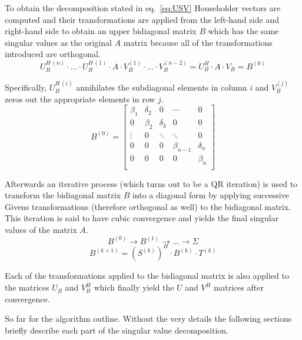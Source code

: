 To obtain the decomposition stated in eq.~\eqref{eq:USV} Householder
vectors are computed and their transformations are applied from the
left-hand side and right-hand side to obtain an upper bidiagonal
matrix $B$ which has the same singular values as the original $A$
matrix because all of the transformations introduced are orthogonal.
\begin{equation}
U_B^{H\,(n)}\cdot\ldots\cdot U_B^{H\,(1)}\cdot A\cdot
V_B^{(1)}\cdot\ldots\cdot V_B^{(n-2)}
= U_B^H\cdot A\cdot V_B = B^{(0)}
\end{equation}

Specifically, $U_B^{H\,(i)}$ annihilates the subdiagonal elements in
column $i$ and $V_B^{(j)}$ zeros out the appropriate elements in row
$j$.
\begin{equation}
B^{(0)} = 
\begin{bmatrix}
\beta_1 & \delta_2 & 0 & \cdots & 0\\
0 & \beta_2 & \delta_3 & 0 & 0\\
\vdots & 0 & \ddots & \ddots & 0\\
0 & 0 & 0 & \beta_{n-1} & \delta_n\\
0 & 0 & 0 & 0 & \beta_n\\
\end{bmatrix}
\end{equation}

Afterwards an iterative process (which turns out to be a QR iteration)
is used to transform the bidiagonal matrix $B$ into a diagonal form by
applying successive Givens transformations (therefore orthogonal as
well) to the bidiagonal matrix.  This iteration is said to have cubic
convergence and yields the final singular values of the matrix $A$.
\begin{equation}
B^{(0)} \rightarrow B^{(1)}\rightarrow \ldots \rightarrow \Sigma
\end{equation}
\begin{equation}
B^{(k+1)} = \left(S^{(k)}\right)^H\cdot B^{(k)}\cdot T^{(k)}
\end{equation}

Each of the transformations applied to the bidiagonal matrix is also
applied to the matrices $U_B$ and $V_B^H$ which finally yield the $U$
and $V^H$ matrices after convergence.

\addvspace{12pt}

So far for the algorithm outline.  Without the very details the
following sections briefly describe each part of the singular value
decomposition.

